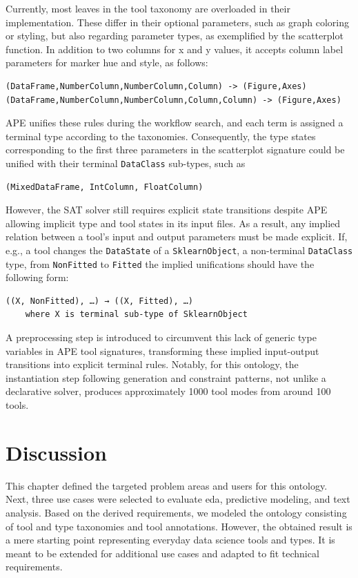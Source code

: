 Currently, most leaves in the tool taxonomy are overloaded in their implementation. These differ in their optional parameters, such as graph coloring or styling, but also regarding parameter types, as exemplified by the scatterplot function. In addition to two columns for x and y values, it accepts column label parameters for marker hue and style, as follows:
\begin{verbatim}
(DataFrame,NumberColumn,NumberColumn,Column) -> (Figure,Axes)
(DataFrame,NumberColumn,NumberColumn,Column,Column) -> (Figure,Axes)
\end{verbatim}
APE unifies these rules during the workflow search, and each term is assigned a terminal type according to the taxonomies. Consequently, the type states corresponding to the first three parameters in the scatterplot signature could be unified with their terminal \verb|DataClass| sub-types, such as
\begin{verbatim}
(MixedDataFrame, IntColumn, FloatColumn)
\end{verbatim}
However, the SAT solver still requires explicit state transitions despite APE allowing implicit type and tool states in its input files. As a result, any implied relation between a tool's input and output parameters must be made explicit. If, e.g., a tool changes the \verb|DataState| of a \verb|SklearnObject|, a non-terminal \verb|DataClass| type, from \verb|NonFitted| to \verb|Fitted| the implied unifications should have the following form: \begin{verbatim}
((X, NonFitted), …) → ((X, Fitted), …)
    where X is terminal sub-type of SklearnObject
\end{verbatim}
A preprocessing step is introduced to circumvent this lack of generic type variables in APE tool signatures, transforming these implied input-output transitions into explicit terminal rules. Notably, for this ontology, the instantiation step following generation and constraint patterns, not unlike a declarative solver, produces approximately 1000 tool modes from around 100 tools.

\section{Discussion}
This chapter defined the targeted problem areas and users for this ontology. Next, three use cases were selected to evaluate \ac{eda}, predictive modeling, and text analysis. Based on the derived requirements, we modeled the ontology consisting of tool and type taxonomies and tool annotations. However, the obtained result is a mere starting point representing everyday data science tools and types. It is meant to be extended for additional use cases and adapted to fit technical requirements.

